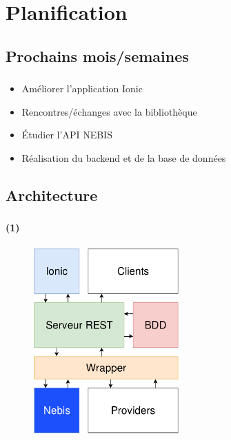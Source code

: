 \documentclass[10pt]{beamer}
\begin{document}
\section{Planification}
\subsection{Prochains mois/semaines}
\begin{frame}
	\frametitle{\secname}
	\framesubtitle{\subsecname}
	\begin{itemize}
        \item Améliorer l'application Ionic
        \item Rencontres/échanges avec la bibliothèque
        \item Étudier l'API NEBIS
        \item Réalisation du backend et de la base de données
    \end{itemize}
\end{frame}

\subsection{Architecture}
\begin{frame}
	\frametitle{\secname}
	\framesubtitle{\subsecname (1)}
	\begin{figure}
		\begin{center}
			\includegraphics[width=0.5\textwidth]{images/architecture.png}
		\end{center}
	\end{figure}
\end{frame}
\end{document}
